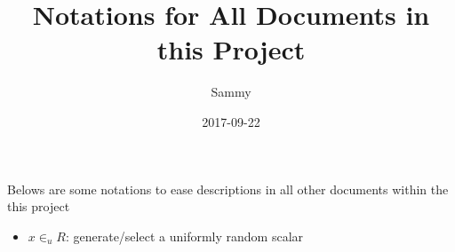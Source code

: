 \documentclass[a4paper,10pt]{article}
\title{Notations for All Documents in this Project}
\author{Sammy}
\date{2017-09-22}
\begin{document}
\maketitle

Belows are some notations to ease descriptions in all other documents within the this project
	\begin{itemize}
		\item \(x\in_u R\): generate/select a uniformly random scalar
	\end{itemize}
\end{document}
